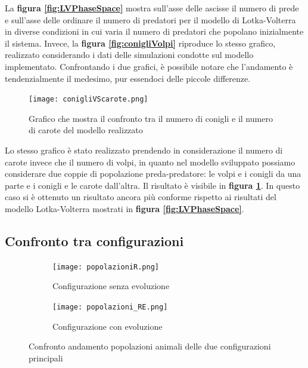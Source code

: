 \documentclass[11pt]{article}
\begin{document}
\newpage 

La \textbf{figura \ref{fig:LVPhaseSpace}} mostra sull'asse delle ascisse il numero di prede e sull'asse delle ordinare il numero di predatori per il modello di Lotka-Volterra in diverse condizioni in cui varia il numero di predatori che popolano inizialmente il sistema. Invece, la \textbf{figura \ref{fig:conigliVolpi}} riproduce lo stesso grafico, realizzato considerando i dati delle simulazioni condotte sul modello implementato. Confrontando i due grafici, è possibile notare che l'andamento è tendenzialmente il medesimo, pur essendoci delle piccole differenze. 


\begin{figure}[h!]
     \centering
     \texttt{[image: conigliVScarote.png]}
     \caption{Grafico che mostra il confronto tra il numero di conigli e il numero di carote del modello realizzato}
     \label{fig:conigliCarote}
\end{figure}


\newpage 


Lo stesso grafico è stato realizzato prendendo in considerazione il numero di carote invece che il numero di volpi, in quanto nel modello sviluppato possiamo considerare due coppie di popolazione preda-predatore: le volpi e i conigli da una parte e i conigli e le carote dall'altra.  
Il risultato è visibile in \textbf{figura \ref{fig:conigliCarote}}. In questo caso si è ottenuto un risultato ancora più conforme rispetto ai risultati del modello Lotka-Volterra mostrati in \textbf{figura \ref{fig:LVPhaseSpace}}.

\newpage

\subsection{Confronto tra configurazioni}

\begin{figure}[]

\begin{subfigure}{\textwidth}
		\centering
     \texttt{[image: popolazioniR.png]}
     \caption{Configurazione senza evoluzione}
     \label{fig:conigliVolpiReintroduzione1}
	\end{subfigure}
	\begin{subfigure}{\textwidth}
		\centering
     \texttt{[image: popolazioni\_RE.png]}
     \caption{Configurazione con evoluzione}
     \label{fig:conigliVolpiRE1}
	\end{subfigure}
	\caption{Confronto andamento popolazioni animali delle due configurazioni principali}
\end{figure}
\end{document}
